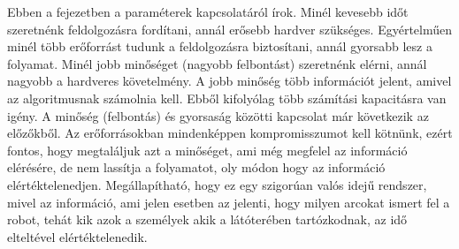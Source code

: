 Ebben a fejezetben a paraméterek kapcsolatáról írok. Minél kevesebb időt szeretnénk feldolgozásra fordítani, annál erősebb hardver szükséges. Egyértelműen minél több erőforrást tudunk a feldolgozásra biztosítani, annál gyorsabb lesz a folyamat. Minél jobb minőséget (nagyobb felbontást) szeretnénk elérni, annál nagyobb a hardveres követelmény. A jobb minőség több információt jelent, amivel az algoritmusnak számolnia kell. Ebből kifolyólag több számítási kapacitásra van igény. A minőség (felbontás) és gyorsaság közötti kapcsolat már következik az előzőkből. Az erőforrásokban mindenképpen kompromisszumot kell kötnünk, ezért fontos, hogy megtaláljuk azt a minőséget, ami még megfelel az információ elérésére, de nem lassítja a folyamatot, oly módon hogy az információ elértéktelenedjen. Megállapítható, hogy ez egy szigorúan valós idejű rendszer, mivel az információ, ami jelen esetben az jelenti, hogy milyen arcokat ismert fel a robot, tehát kik azok a személyek akik a látóterében tartózkodnak, az idő elteltével elértéktelenedik. 